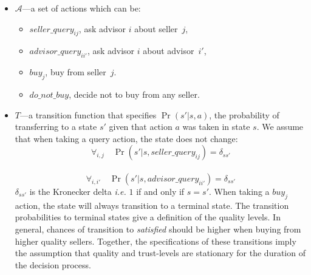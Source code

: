 \documentclass{aamas2013}
\newlength{\EqSpace}
\begin{document}
\begin{itemize}
\item $\mathcal{A}$---a set of actions which can be:\\[-1.8em]
        \begin{itemize}
            \item $seller\_query_{ij}$, ask advisor $i$ about seller~$j$,
            \item $advisor\_query_{ii'}$, ask advisor $i$ about advisor~$i'$,
            \item $buy_{j}$, buy from seller~$j$.
            \item $do\_not\_buy$, decide not to buy from any seller.
        \end{itemize}
    \vspace{-1em}
\item $T$---a transition function that specifies $\Pr(s'|s,a)$, the probability of transferring to a state $s'$ given that action $a$ was taken in state $s$. We assume that when taking a query action, the state does not change:
        \begin{equation}
            \forall_{i,j}\quad\Pr(s'|s,seller\_query_{ij})=\delta_{ss'}
        \end{equation}
        \\[\EqSpace]
        \begin{equation}
            \forall_{i,i'}\quad\Pr(s'|s,advisor\_query_{ii'})=\delta_{ss'}
        \end{equation}
    $\delta_{ss'}$ is the Kronecker delta \textit{i.e.} $1$ if and only if $s=s'$. When taking a $buy_{j}$ action, the state will always transition to a terminal state. The transition probabilities to terminal states give a definition of the quality levels. In general, chances of transition to \textit{satisfied} should be higher when buying from higher quality sellers. Together, the specifications of these transitions imply the assumption that quality and trust-levels are stationary for the duration of the decision process.


\end{itemize}
\end{document}
